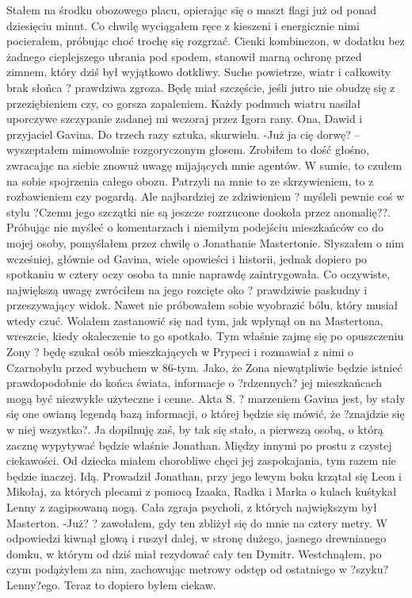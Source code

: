 \documentclass[../MAIN.tex]{subfiles}
\begin{document}
Stałem na środku obozowego placu, opierając się o maszt flagi już od ponad dziesięciu minut. Co chwilę wyciągałem ręce z kieszeni i energicznie nimi pocierałem, próbując choć trochę się rozgrzać. Cienki kombinezon, w dodatku bez żadnego cieplejszego ubrania pod spodem, stanowił marną ochronę przed zimnem, który dziś był wyjątkowo dotkliwy. Suche powietrze, wiatr i całkowity brak słońca ? prawdziwa zgroza. Będę miał szczęście, jeśli jutro nie obudzę się z przeziębieniem czy, co gorsza zapaleniem.
Każdy podmuch wiatru nasilał uporczywe szczypanie zadanej mi wczoraj przez Igora rany. Ona, Dawid i przyjaciel Gavina. Do trzech razy sztuka, skurwielu.
-Już ja cię dorwę? -- wyszeptałem mimowolnie rozgoryczonym głosem. Zrobiłem to dość głośno, zwracając na siebie znowuż uwagę mijających mnie agentów. W sumie, to czułem na sobie spojrzenia całego obozu. Patrzyli na mnie to ze skrzywieniem, to z rozbawieniem czy pogardą. Ale najbardziej ze zdziwieniem ? myśleli pewnie coś w stylu ?Czemu jego szczątki nie są jeszcze rozrzucone dookoła przez anomalię??.
Próbując nie myśleć o komentarzach i niemiłym podejściu mieszkańców co do mojej osoby, pomyślałem przez chwilę o Jonathanie Mastertonie.
Słyszałem o nim wcześniej, głównie od Gavina, wiele opowieści i historii, jednak dopiero po spotkaniu w cztery oczy osoba ta mnie naprawdę zaintrygowała. Co oczywiste, największą uwagę zwróciłem na jego rozcięte oko ? prawdziwie paskudny i przeszywający widok. Nawet nie próbowałem sobie wyobrazić bólu, który musiał wtedy czuć. Wolałem zastanowić się nad tym, jak wpłynął on na Mastertona, wreszcie, kiedy okaleczenie to go spotkało.
Tym właśnie zajmę się po opuszczeniu Zony ? będę szukał osób mieszkających w Prypeci i rozmawiał z nimi o Czarnobylu przed wybuchem w 86-tym. Jako, że Zona niewątpliwie będzie istnieć prawdopodobnie do końca świata, informacje o ?rdzennych? jej mieszkańcach mogą być niezwykle użyteczne i cenne. Akta S. ? marzeniem Gavina jest, by stały się one owianą legendą bazą informacji, o której będzie się mówić, że ?znajdzie się w niej wszystko?. Ja dopilnuję zaś, by tak się stało, a pierwszą osobą, o którą zacznę wypytywać będzie właśnie Jonathan.
Między innymi po prostu z czystej ciekawości. Od dziecka miałem chorobliwe chęci jej zaspokajania, tym razem nie będzie inaczej.
Idą.
Prowadził Jonathan, przy jego lewym boku krzątał się Leon i Mikołaj, za których plecami z pomocą Izaaka, Radka i Marka o kulach kuśtykał Lenny z zagipsowaną nogą.
Cała zgraja psycholi, z których największym był Masterton.
-Już? ? zawołałem, gdy ten zbliżył się do mnie na cztery metry. W odpowiedzi kiwnął głową i ruszył dalej, w stronę dużego, jasnego drewnianego domku, w którym od dziś miał rezydować cały ten Dymitr.
Westchnąłem, po czym podążyłem za nim, zachowując metrowy odstęp od ostatniego w ?szyku? Lenny?ego.
Teraz to dopiero byłem ciekaw.
\end{document}
